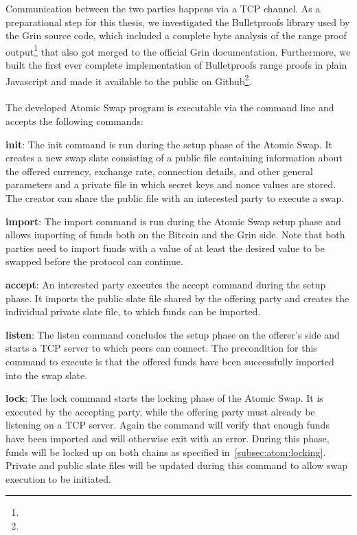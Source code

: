 Communication between the two parties happens via a TCP channel.
As a preparational step for this thesis, we investigated the Bulletproofs library used by the Grin source code, which included a complete byte analysis of the range proof output\footnote{\urlrpbytes} that also got merged to the official Grin documentation.
Furthermore, we built the first ever complete implementation of Bulletproofs range proofs in plain Javascript and made it available to the public on Github\footnote{\urlbpjs}.
\\ \\
The developed Atomic Swap program is executable via the command line and accepts the following commands:
\begin{asparaitem}
    \item \textbf{init}: The init command is run during the setup phase of the Atomic Swap.
    It creates a new swap slate consisting of a public file containing information about the offered currency, exchange rate, connection details, and other general parameters and a private file in which secret keys and nonce values are stored.
    The creator can share the public file with an interested party to execute a swap.
    \item \textbf{import}: The import command is run during the Atomic Swap setup phase and allows importing of funds both on the Bitcoin and the Grin side.
    Note that both parties need to import funds with a value of at least the desired value to be swapped before the protocol can continue.
    \item \textbf{accept}: An interested party executes the accept command during the setup phase.
    It imports the public slate file shared by the offering party and creates the individual private slate file, to which funds can be imported.
    \item \textbf{listen}: The listen command concludes the setup phase on the offerer's side and starts a TCP server to which peers can connect.
    The precondition for this command to execute is that the offered funds have been successfully imported into the swap slate.
    \item \textbf{lock}: The lock command starts the locking phase of the Atomic Swap.
    It is executed by the accepting party, while the offering party must already be listening on a TCP server.
    Again the command will verify that enough funds have been imported and will otherwise exit with an error.
    During this phase, funds will be locked up on both chains as specified in~\cref{subsec:atom:locking}.
    Private and public slate files will be updated during this command to allow swap execution to be initiated.

\end{asparaitem}
